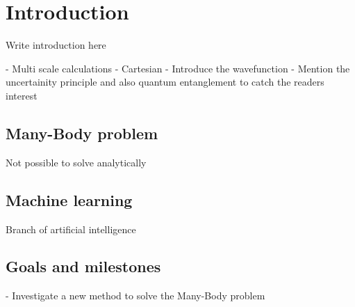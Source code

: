 \chapter{Introduction}
Write introduction here

 - Multi scale calculations
 - Cartesian
 - Introduce the wavefunction
 - Mention the uncertainity principle and also quantum entanglement to catch the readers interest
 
 
\section{Many-Body problem} \label{subsec:manybodyproblem}
Not possible to solve analytically

\section{Machine learning} \label{subsec:machinelearning}
Branch of artificial intelligence

\section{Goals and milestones} \label{subsec:goals}
- Investigate a new method to solve the Many-Body problem